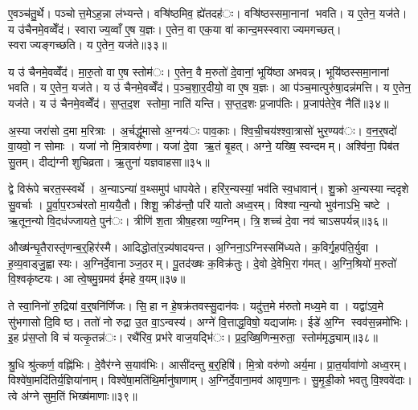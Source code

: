 ए॒वञ्च॑तु॒र्थे। पञ्चोत्त॒मेऽह॒न्ना ल॑भ्यन्ते। वऱ्षि॑ष्ठमिव॒ ह्ये॑तदह॑ः। वऱ्षि॑ष्ठस्समा॒नानां भवति। य ए॒तेन॒ यज॑ते। य उ॑चैनमे॒वव्वेँद॑। स्वाराज्य॒व्वाँ ए॒ष य॒ज्ञः। ए॒तेन॒ वा एक॒या वा॑ कान्द॒मस्स्वाराज्यमगच्छत्। स्वराज्यङ्गच्छति। य ए॒तेन॒ यज॑ते॥३३॥

य उ॑ चैनमे॒वव्वेँद॑। मा॒रु॒तो वा ए॒ष स्तोम॑ः। ए॒तेन॒ वै म॒रुतो॑ दे॒वानां॒ भूयि॑ष्ठा अभवन्न्। भूयि॑ष्ठस्समा॒नानां भवति। य ए॒तेन॒ यज॑ते। य उ॑ चैनमे॒वव्वेँद॑। प॒ञ्च॒शा॒र॒दीयो॒ वा ए॒ष य॒ज्ञः। आ प॑ञ्च॒मात्पुरु॑षा॒दन्न॑मत्ति। य ए॒तेन॒ यज॑ते। य उ॑ चैनमे॒वव्वेँद॑। स॒प्त॒द॒श स्तोमा॒ नाति॑ यन्ति। स॒प्त॒द॒शः प्र॒जाप॑तिः। प्र॒जाप॑तेरे॒व नैति॑॥३४॥


अ॒स्या जरा॑सो द॒मा म॒रित्राः। अ॒र्चद्धू॑मासो अ॒ग्नय॑ः पाव॒काः। श्वि॒ची॒चय॑श्श्वा॒त्रासो॑ भुर॒ण्यव॑ः। व॒न॒र्॒षदो॑ वा॒यवो॒ न सोमाः। यजा॑ नो मि॒त्रावरु॑णा। यजा॑ दे॒वा ऋ॒तं बृ॒हत्। अग्ने॒ यख्षि॒ स्वन्दमम्। अश्वि॑ना॒ पिब॑त सु॒तम्। दीद्य॑ग्नी शुचिव्रता। ऋ॒तुना॑ यज्ञवाहसा॥३५॥

द्वे विरू॑पे चरत॒स्स्वर्थे। अ॒न्याऽन्या॑ व॒थ्समुप॑ धापयेते। हरि॑र॒न्यस्यां॒ भव॑ति स्व॒धावान्॑। शु॒क्रो अ॒न्यस्यान्ददृशे सु॒वर्चाः। पू॒र्वा॒प॒रञ्च॑रतो मा॒ययै॒तौ। शिशू॒ क्रीड॑न्तौ॒ परि॑ यातो अध्व॒रम्। विश्वान्य॒न्यो भुव॑नाऽभि॒ चष्टे। ऋ॒तून॒न्यो वि॒दध॑ज्जायते॒ पुन॑ः। त्रीणि॑ श॒ता त्रीष॒हस्राण्य॒ग्निम्। त्रि॒शच्च॑ दे॒वा नव॑ चाऽसपर्यन्न्॥३६॥

औख्ष॑न्घृ॒तैरास्तृ॑णन्ब॒र्॒हिर॑स्मै। आदिद्धोता॑र॒न्न्य॑षादयन्त। अ॒ग्निना॒ऽग्निस्समि॑ध्यते। क॒विर्गृ॒हप॑ति॒र्युवा। ह॒व्य॒वाड्जु॒ह्वास्यः। अ॒ग्निर्दे॒वानाञ्ज॒ठरम्। पू॒तद॑ख्षः क॒विक्र॑तुः। दे॒वो दे॒वेभि॒रा ग॑मत्। अ॒ग्नि॒श्रियो॑ म॒रुतो॑ वि॒श्वकृ॑ष्टयः। आ त्वे॒षमु॒ग्रमव॑ ईमहे व॒यम्॥३७॥

ते स्वा॒निनो॑ रु॒द्रिया॑ व॒र्॒षनि॑र्णिजः। सि॒हा न हे॒षक्र॑तवस्सु॒दान॑वः। यदु॑त्त॒मे म॑रुतो मध्य॒मे वा। यद्वा॑ऽव॒मे सु॑भगासो दि॒वि ष्ठ। ततो॑ नो रुद्रा उ॒त वा॒ऽन्वस्य॑। अग्ने॑ वि॒त्ताद्ध॒विषो॒ यद्यजा॑मः। ईडे॑ अ॒ग्नि स्वव॑स॒न्नमो॑भिः। इ॒ह प्र॑स॒प्तो वि च॑ यत्कृ॒तन्न॑ः। रथै॑रिव॒ प्रभ॑रे वाज॒यद्भि॑ः। प्र॒द॒ख्षि॒णिन्म॒रुता॒ स्तोम॑मृद्ध्याम्॥३८॥

श्रु॒धि श्रु॑त्कर्ण॒ वह्नि॑भिः। दे॒वैर॑ग्ने स॒याव॑भिः। आसी॑दन्तु ब॒र्॒हिषि॑। मि॒त्रो वरु॑णो अर्य॒मा। प्रा॒त॒र्यावा॑णो अध्व॒रम्। विश्वे॑षा॒मदि॑तिर्य॒ज्ञिया॑नाम्। विश्वे॑षा॒मति॑थि॒र्मानु॑षाणाम्। अ॒ग्निर्दे॒वाना॒मव॑ आवृणा॒नः। सु॒मृ॒डी॒को भवतु वि॒श्ववे॑दाः। त्वे अ॑ग्ने सुम॒तिं भिख्ष॑माणाः॥३९॥

